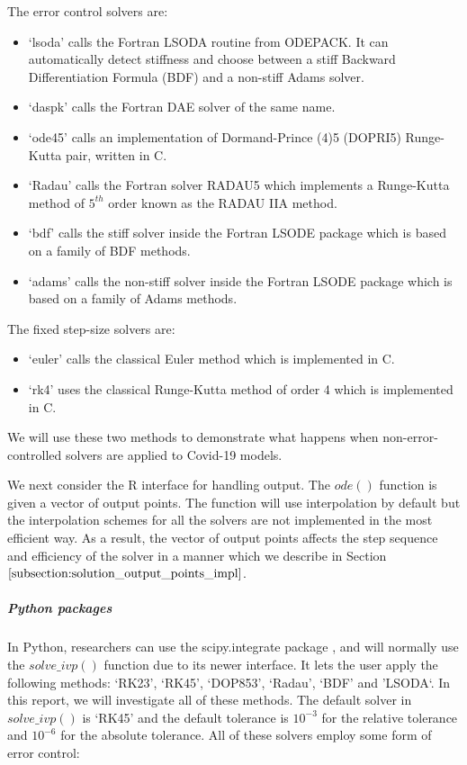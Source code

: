 The error control solvers are:
\begin{itemize}
\item `lsoda' calls the Fortran LSODA routine from ODEPACK. It can automatically detect stiffness and choose between a stiff Backward Differentiation Formula (BDF) and a non-stiff Adams solver.

\item `daspk' calls the Fortran DAE solver of the same name.

\item `ode45' calls an implementation of Dormand-Prince (4)5 (DOPRI5) Runge-Kutta pair, written in C.

\item `Radau' calls the Fortran solver RADAU5 which implements a Runge-Kutta method of $5^{th}$ order known as the RADAU IIA method.

\item `bdf' calls the stiff solver inside the Fortran LSODE package which is based on a family of BDF methods.

\item `adams' calls the non-stiff solver inside the Fortran LSODE package which is based on a family of Adams methods.
\end{itemize}

The fixed step-size solvers are:
\begin{itemize}
\item `euler' calls the classical Euler method which is implemented in C.
\item `rk4' uses the classical Runge-Kutta method of order 4 which is implemented in C. 
\end{itemize}

We will use these two methods to demonstrate what happens when non-error-controlled solvers are applied to Covid-19 models.

We next consider the R interface for handling output. The $ode()$ function is given a vector of output points.  The function will use interpolation by default but the interpolation schemes for all the solvers are not implemented in the most efficient way. As a result, the vector of output points affects the step sequence and efficiency of the solver in a manner which we describe in Section $\ref{subsection:solution_output_points_impl}$.

\subparagraph{Python packages}
In Python, researchers can use the scipy.integrate package \cite{2020SciPy-NMeth}, and will normally use the $solve\_ivp()$ function due to its newer interface. It lets the user apply the following methods: `RK23', `RK45', `DOP853', `Radau', `BDF' and 'LSODA`. In this report, we will investigate all of these methods. The default solver in $solve\_ivp()$ is `RK45' and the default tolerance is $10^{-3}$ for the relative tolerance and $10^{-6}$ for the absolute tolerance. All of these solvers employ some form of error control:

